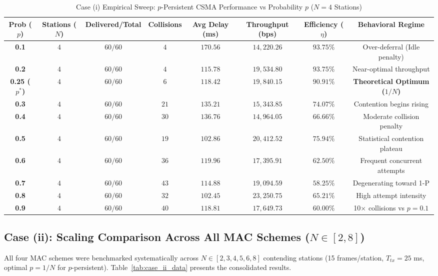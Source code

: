 \documentclass[11pt,a4paper]{article}
\begin{document}
\begin{table}[htbp]
\centering
\scriptsize
\renewcommand{\arraystretch}{1.18}
\begin{tabular}{c c c c c c c c}
\rowcolor{tableheader}
\color{white}Prob ($p$) & \color{white}Stations ($N$) & \color{white}Delivered/Total & \color{white}Collisions & \color{white}Avg Delay (ms) & \color{white}Throughput (bps) & \color{white}Efficiency ($\eta$) & \color{white}Behavioral Regime \\
\hline
\textbf{0.1} & $4$ & $60 / 60$ & $4$ & $170.56$ & $14{,}220.26$ & $93.75\%$ & Over-deferral (Idle penalty) \\
\textbf{0.2} & $4$ & $60 / 60$ & $4$ & $115.78$ & $19{,}534.80$ & $93.75\%$ & Near-optimal throughput \\
\rowcolor{softblue!25} \textbf{0.25 ($p^*$)} & $4$ & $60 / 60$ & $6$ & $118.42$ & $19{,}840.15$ & $90.91\%$ & \textbf{Theoretical Optimum ($1/N$)} \\
\textbf{0.3} & $4$ & $60 / 60$ & $21$ & $135.21$ & $15{,}343.85$ & $74.07\%$ & Contention begins rising \\
\textbf{0.4} & $4$ & $60 / 60$ & $30$ & $136.76$ & $14{,}964.05$ & $66.66\%$ & Moderate collision penalty \\
\textbf{0.5} & $4$ & $60 / 60$ & $19$ & $102.86$ & $20{,}412.52$ & $75.94\%$ & Statistical contention plateau \\
\textbf{0.6} & $4$ & $60 / 60$ & $36$ & $119.96$ & $17{,}395.91$ & $62.50\%$ & Frequent concurrent attempts \\
\textbf{0.7} & $4$ & $60 / 60$ & $43$ & $114.88$ & $19{,}094.59$ & $58.25\%$ & Degenerating toward 1-P \\
\textbf{0.8} & $4$ & $60 / 60$ & $32$ & $102.45$ & $23{,}250.75$ & $65.21\%$ & High attempt intensity \\
\textbf{0.9} & $4$ & $60 / 60$ & $40$ & $118.81$ & $17{,}649.73$ & $60.00\%$ & 10$\times$ collisions vs $p=0.1$ \\
\bottomrule
\end{tabular}
\caption{Case (i) Empirical Sweep: $p$-Persistent CSMA Performance vs Probability $p$ ($N=4$ Stations)}
\label{tab:case_i_data}
\end{table}

\subsection{Case (ii): Scaling Comparison Across All MAC Schemes ($N \in [2, 8]$)}
All four MAC schemes were benchmarked systematically across $N \in [2, 3, 4, 5, 6, 8]$ contending stations (15 frames/station, $T_{tx} = 25$ ms, optimal $p = 1/N$ for $p$-persistent). Table~\ref{tab:case_ii_data} presents the consolidated results.
\end{document}
